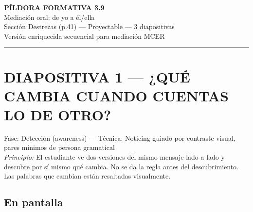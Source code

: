 \documentclass[a4paper,11pt]{article}
\begin{document}
\begin{center}
{\LARGE\textbf{PÍLDORA FORMATIVA 3.9}}\\[0.3cm]
{\Large Mediación oral: de yo a él/ella}\\[0.2cm]
{\normalsize Sección Destrezas (p.41) — Proyectable — 3 diapositivas}\\[0.2cm]
{\small Versión enriquecida secuencial para mediación MCER}
\end{center}

\vspace{0.5cm}

\noindent{}

\vspace{0.8cm}


\noindent\textcolor{violeta}{\rule{\linewidth}{2.5pt}}

\section*{DIAPOSITIVA 1 — ¿QUÉ CAMBIA CUANDO CUENTAS LO DE OTRO?}

{\small Fase: Detección (awareness) — Técnica: Noticing guiado por contraste visual, pares mínimos de persona gramatical}\\
{\small\textit{Principio:} El estudiante ve dos versiones del mismo mensaje lado a lado y descubre por sí mismo qué cambia. No se da la regla antes del descubrimiento. Las palabras que cambian están resaltadas visualmente.}

\vspace{0.5cm}

\subsection*{En pantalla}
\end{document}

